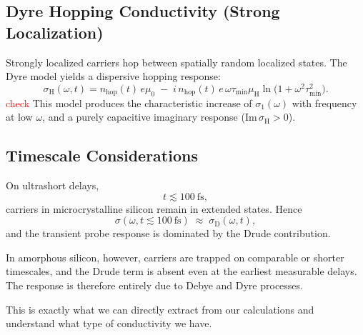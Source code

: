 \subsection{Dyre Hopping Conductivity (Strong Localization)}

Strongly localized carriers hop between spatially random localized
states. The Dyre model yields a dispersive hopping response:
\[
\sigma_{\mathrm{H}}(\omega,t)
=
n_{\mathrm{hop}}(t)\, e \mu_0
\;-\;
i\, n_{\mathrm{hop}}(t)\, e\,
\omega \tau_{\min} \mu_{\mathrm{H}}
\ln\!\bigl( 1 + \omega^2 \tau_{\min}^2 \bigr).
\]
\textcolor{red}{check}
This model produces the characteristic increase of
\(\sigma_1(\omega)\) with frequency at low \(\omega\), and a purely
capacitive imaginary response (\(\mathrm{Im}\,\sigma_{\mathrm{H}} > 0\)).


\subsection{Timescale Considerations}

On ultrashort delays,
\[
t \lesssim 100~\mathrm{fs},
\]
carriers in microcrystalline silicon remain in extended states. Hence
\[
\sigma(\omega, t \lesssim 100\ \mathrm{fs})
\;\approx\;
\sigma_{\mathrm{D}}(\omega,t),
\]
and the transient probe response is dominated by the Drude contribution.

In amorphous silicon, however, carriers are trapped on comparable or
shorter timescales, and the Drude term is absent even at the earliest
measurable delays. The response is therefore entirely due to Debye and
Dyre processes.

This is exactly what we can directly extract from our calculations and understand what type of conductivity we have.













